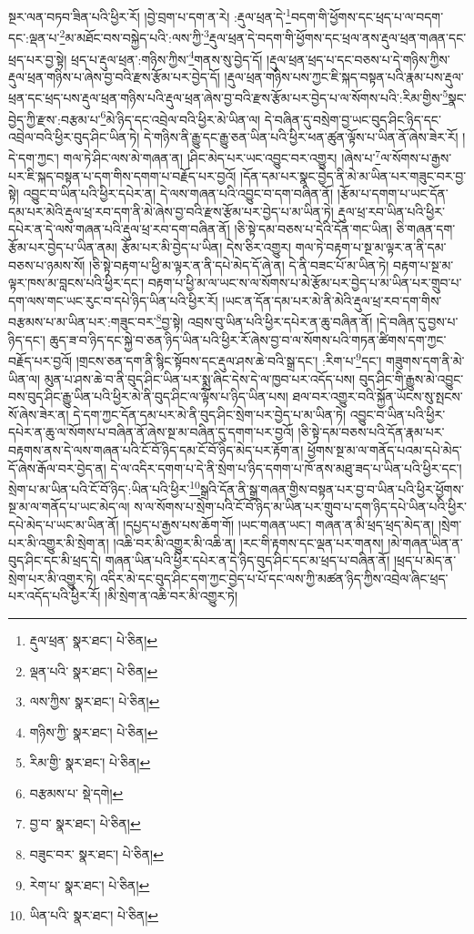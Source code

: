 སྔར་ལན་བཏབ་ཟིན་པའི་ཕྱིར་རོ། །བྱེ་བྲག་པ་དག་ན་རེ། :རྡུལ་ཕྲན་དེ་\footnote{རྡུལ་ཕྲན་  སྣར་ཐང་།  པེ་ཅིན། }བདག་གི་ཕྱོགས་དང་ཕྲད་པ་ལ་བདག་དང་:ལྡན་པ་\footnote{ལྡན་པའི་  སྣར་ཐང་།  པེ་ཅིན། }མ་མཐོང་བས་བསྐྱེད་པའི་:ལས་ཀྱི་\footnote{ལས་ཀྱིས་  སྣར་ཐང་།  པེ་ཅིན། }རྡུལ་ཕྲན་དེ་བདག་གི་ཕྱོགས་དང་ཕྲལ་ནས་རྡུལ་ཕྲན་གཞན་དང་ཕྲད་པར་བྱ་སྟེ། ཕྲད་པ་རྡུལ་ཕྲན་:གཉིས་ཀྱིས་\footnote{གཉིས་ཀྱི་  སྣར་ཐང་།  པེ་ཅིན། }གནས་སུ་བྱེད་དོ། །རྡུལ་ཕྲན་ཕྲད་པ་དང་བཅས་པ་དེ་གཉིས་ཀྱིས་རྡུལ་ཕྲན་གཉིས་པ་ཞེས་བྱ་བའི་རྫས་རྩོམ་པར་བྱེད་དོ། །རྡུལ་ཕྲན་གཉིས་པས་ཀྱང་ཇི་སྐད་བསྟན་པའི་རྣམ་པས་རྡུལ་ཕྲན་དང་ཕྲད་པས་རྡུལ་ཕྲན་གཉིས་པའི་རྡུལ་ཕྲན་ཞེས་བྱ་བའི་རྫས་རྩོམ་པར་བྱེད་པ་ལ་སོགས་པའི་:རིམ་གྱིས་\footnote{རིམ་གྱི་  སྣར་ཐང་།  པེ་ཅིན། }སྣང་བྱེད་ཀྱི་རྫས་:བརྩམ་པ་\footnote{བརྩམས་པ་  སྡེ་དགེ། }མེ་ཉིད་དང་འབྲེལ་བའི་ཕྱིར་མེ་ཡིན་ལ། དེ་བཞིན་དུ་བསྲེག་བྱ་ཡང་བུད་ཤིང་ཉིད་དང་འབྲེལ་བའི་ཕྱིར་བུད་ཤིང་ཡིན་ཏེ། དེ་གཉིས་ནི་རྒྱུ་དང་རྒྱུ་ཅན་ཡིན་པའི་ཕྱིར་ཕན་ཚུན་ལྟོས་པ་ཡིན་ནོ་ཞེས་ཟེར་རོ། །དེ་དག་ཀྱང་། གལ་ཏེ་ཤིང་ལས་མེ་གཞན་ན། །ཤིང་མེད་པར་ཡང་འབྱུང་བར་འགྱུར། །ཞེས་པ་\footnote{བྱ་བ་  སྣར་ཐང་།  པེ་ཅིན། }ལ་སོགས་པ་རྒྱས་པར་ཇི་སྐད་བསྟན་པ་དག་གིས་དགག་པ་བརྗོད་པར་བྱའོ། །དོན་དམ་པར་སྣང་བྱེད་ནི་མེ་མ་ཡིན་པར་གཟུང་བར་བྱ་སྟེ། འབྱུང་བ་ཡིན་པའི་ཕྱིར་དཔེར་ན། དེ་ལས་གཞན་པའི་འབྱུང་བ་དག་བཞིན་ནོ། །རྩོམ་པ་དགག་པ་ཡང་དོན་དམ་པར་མེའི་རྡུལ་ཕྲ་རབ་དག་ནི་མེ་ཞེས་བྱ་བའི་རྫས་རྩོམ་པར་བྱེད་པ་མ་ཡིན་ཏེ། རྡུལ་ཕྲ་རབ་ཡིན་པའི་ཕྱིར་དཔེར་ན་དེ་ལས་གཞན་པའི་རྡུལ་ཕྲ་རབ་དག་བཞིན་ནོ། །ཅི་སྟེ་དམ་བཅས་པ་དེའི་དོན་གང་ཡིན། ཅི་གཞན་དག་རྩོམ་པར་བྱེད་པ་ཡིན་ནམ། རྩོམ་པར་མི་བྱེད་པ་ཡིན། དེས་ཅིར་འགྱུར། གལ་ཏེ་བརྟག་པ་སྔ་མ་ལྟར་ན་ནི་དམ་བཅས་པ་ཉམས་སོ། །ཅི་སྟེ་བརྟག་པ་ཕྱི་མ་ལྟར་ན་ནི་དཔེ་མེད་དོ་ཞེ་ན། དེ་ནི་བཟང་པོ་མ་ཡིན་ཏེ། བརྟག་པ་སྔ་མ་ལྟར་ཁས་མ་བླངས་པའི་ཕྱིར་དང་། བརྟག་པ་ཕྱི་མ་ལ་ཡང་ས་ལ་སོགས་པ་མེ་རྩོམ་པར་བྱེད་པ་མ་ཡིན་པར་གྲུབ་པ་དག་ལས་གང་ཡང་རུང་བ་དཔེ་ཉིད་ཡིན་པའི་ཕྱིར་རོ། །ཡང་ན་དོན་དམ་པར་མེ་ནི་མེའི་རྡུལ་ཕྲ་རབ་དག་གིས་བརྩམས་པ་མ་ཡིན་པར་:གཟུང་བར་\footnote{བཟུང་བར་  སྣར་ཐང་།  པེ་ཅིན། }བྱ་སྟེ། འབྲས་བུ་ཡིན་པའི་ཕྱིར་དཔེར་ན་ཆུ་བཞིན་ནོ། །དེ་བཞིན་དུ་བྱས་པ་ཉིད་དང་། ཆུད་ཟ་བ་ཉིད་དང་སྐྱེ་བ་ཅན་ཉིད་ཡིན་པའི་ཕྱིར་རོ་ཞེས་བྱ་བ་ལ་སོགས་པའི་གཏན་ཚིགས་དག་ཀྱང་བརྗོད་པར་བྱའོ། །གྲངས་ཅན་དག་ནི་སྙིང་སྟོབས་དང་རྡུལ་ཤས་ཆེ་བའི་སྒྲ་དང་། :རིག་པ་\footnote{རེག་པ་  སྣར་ཐང་།  པེ་ཅིན། }དང་། གཟུགས་དག་ནི་མེ་ཡིན་ལ། མུན་པ་ཤས་ཆེ་བ་ནི་བུད་ཤིང་ཡིན་པར་སྨྲ་ཞིང་དེས་དེ་ལ་ཁྱབ་པར་འདོད་པས། བུད་ཤིང་གི་རྒྱུས་མེ་འབྱུང་བས་བུད་ཤིང་རྒྱུ་ཡིན་པའི་ཕྱིར་མེ་ནི་བུད་ཤིང་ལ་ལྟོས་པ་ཉིད་ཡིན་པས། ཐལ་བར་འགྱུར་བའི་སྐྱོན་ཡོངས་སུ་སྤངས་སོ་ཞེས་ཟེར་ན། དེ་དག་ཀྱང་དོན་དམ་པར་མེ་ནི་བུད་ཤིང་སྲེག་པར་བྱེད་པ་མ་ཡིན་ཏེ། འབྱུང་བ་ཡིན་པའི་ཕྱིར་དཔེར་ན་ཆུ་ལ་སོགས་པ་བཞིན་ནོ་ཞེས་སྔ་མ་བཞིན་དུ་དགག་པར་བྱའོ། །ཅི་སྟེ་དམ་བཅས་པའི་དོན་རྣམ་པར་བརྟགས་ནས་དེ་ལས་གཞན་པའི་ངོ་བོ་ཉིད་དམ་ངོ་བོ་ཉིད་མེད་པར་རྟོག་ན། ཕྱོགས་སྔ་མ་ལ་གནོད་པའམ་དཔེ་མེད་དོ་ཞེས་རྒོལ་བར་བྱེད་ན། དེ་ལ་འདིར་དགག་པ་དེ་ནི་སྲེག་པ་ཉིད་དགག་པ་ཁོ་ནས་མཐུ་ཟད་པ་ཡིན་པའི་ཕྱིར་དང་། སྲེག་པ་མ་ཡིན་པའི་ངོ་བོ་ཉིད་:ཡིན་པའི་ཕྱིར་\footnote{ཡིན་པའི་  སྣར་ཐང་།  པེ་ཅིན། }སྒྲའི་དོན་ནི་སྒྲ་གཞན་གྱིས་བསྟན་པར་བྱ་བ་ཡིན་པའི་ཕྱིར་ཕྱོགས་སྔ་མ་ལ་གནོད་པ་ཡང་མེད་ལ། ས་ལ་སོགས་པ་སྲེག་པའི་ངོ་བོ་ཉིད་མ་ཡིན་པར་གྲུབ་པ་དག་ཉིད་དཔེ་ཡིན་པའི་ཕྱིར་དཔེ་མེད་པ་ཡང་མ་ཡིན་ནོ། །དཔྱད་པ་རྒྱས་པས་ཆོག་གོ། །ཡང་གཞན་ཡང་། གཞན་ན་མི་ཕྲད་ཕྲད་མེད་ན། །སྲེག་པར་མི་འགྱུར་མི་སྲེག་ན། །འཆི་བར་མི་འགྱུར་མི་འཆི་ན། །རང་གི་རྟགས་དང་ལྡན་པར་གནས། །མེ་གཞན་ཡིན་ན་བུད་ཤིང་དང་མི་ཕྲད་དེ། གཞན་ཡིན་པའི་ཕྱིར་དཔེར་ན་དེ་ཉིད་བུད་ཤིང་དང་མ་ཕྲད་པ་བཞིན་ནོ། །ཕྲད་པ་མེད་ན་སྲེག་པར་མི་འགྱུར་ཏེ། འདིར་མེ་དང་བུད་ཤིང་དག་ཀྱང་བྱེད་པ་པོ་དང་ལས་ཀྱི་མཚན་ཉིད་ཀྱིས་འབྲེལ་ཞིང་ཕྲད་པར་འདོད་པའི་ཕྱིར་རོ། །མི་སྲེག་ན་འཆི་བར་མི་འགྱུར་ཏེ། 